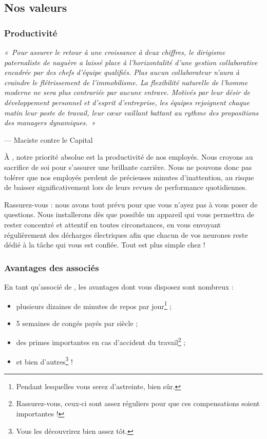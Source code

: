 \subsection{Nos valeurs}

\subsubsection{Productivité}

\emph{« Pour assurer le retour à une croissance à deux chiffres, le dirigisme
paternaliste de naguère a laissé place à l'horizontalité d'une gestion
collaborative encadrée par des chefs d'équipe qualifiés. Plus aucun
collaborateur n'aura à craindre le flétrissement de l'immobilisme. La
flexibilité naturelle de l'homme moderne ne sera plus contrariée par aucune
entrave. Motivés par leur désir de développement personnel et d'esprit
d'entreprise, les équipes rejoignent chaque matin leur poste de travail, leur
cœur vaillant battant au rythme des propositions des managers dynamiques. »}

\vspace{0.3cm}
\hspace{3cm} --- Maciste contre le Capital

À \provogon{}, notre priorité absolue est la productivité de nos employés. Nous
croyons au sacrifice de soi pour s'assurer une brillante carrière. Nous ne
pouvons donc pas tolérer que nos employés perdent de précieuses minutes
d'inattention, au risque de baisser significativement lors de leurs revues de
performance quotidiennes.

Rassurez-vous : nous avons tout prévu pour que vous n'ayez pas à vous poser de
questions. Nous installerons dès que possible un appareil qui vous permettra
de rester concentré et attentif en toutes circonstances, en vous envoyant
régulièrement des décharges électriques afin que chacun de vos neurones reste
dédié à la tâche qui vous est confiée. Tout est plus simple chez \provogon{} !

\subsubsection{Avantages des associés}

En tant qu'associé de \provogon{}, les avantages dont vous disposez sont nombreux :

\begin{itemize}
    \item plusieurs dizaines de minutes de repos par jour\footnote{Pendant
        lesquelles vous serez d'astreinte, bien sûr.} ;
    \item 5 semaines de congés payés par siècle ;
    \item des primes importantes en cas d'accident du
        travail\footnote{Rassurez-vous, ceux-ci sont assez réguliers pour
        que ces compensations soient importantes !} ;
    \item et bien d'autres\footnote{Vous les découvrirez bien assez tôt.} !
\end{itemize}

